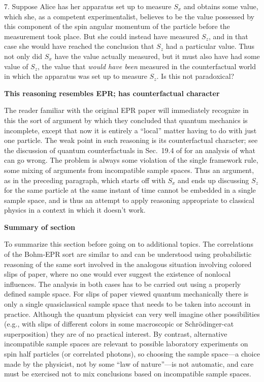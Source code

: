 \documentclass[12pt]{article} %
\def\outl#1{\par{\medskip\noindent\hspace*{.5cm}\bf
      \mathversion{bold}#1\mathversion{normal}\smallskip} }
\def\np{} \def\xa{} \def\xb{} \def\xn{} \def\xp{}
\def\outl#1{} \def\np{} \def\xa{} \def\xb{} \def\xn{} \def\xp{}
\def\outl#1{\par{\medskip\noindent\hspace*{.5cm}\bf
      \mathversion{bold}#1\mathversion{normal}\smallskip} }
\def\np{\newpage }\def\xn{\nopagebreak }\def\xp{\pagebreak }
\begin{document}
7. Suppose Alice has her apparatus set up to measure $S_x$ and obtains
some value, which she, as a competent experimentalist, believes to be the
value possessed by this component of the spin angular momentum of the particle
before the measurement took place.  But she could instead have measured $S_z$,
and in that case she would have reached the conclusion that $S_z$ had a
particular value.  Thus not only did $S_x$ have the value actually measured,
but it must also have had some value of $S_z$, the value that \emph{would have
  been} measured in the counterfactual world in which the apparatus was set up
to measure $S_z$.  Is this not paradoxical?

\xb
\outl{This reasoning resembles EPR; has counterfactual character}
\xa


The reader familiar with the original EPR paper \cite{EnPR35} will immediately
recognize in this the sort of argument by which they concluded that quantum
mechanics is incomplete, except that now it is entirely a ``local'' matter
having to do with just one particle.  The weak point in such reasoning is its
counterfactual character; see the discussion of quantum counterfactuals in
Sec.~19.4 of \cite{Grff02c} for an analysis of what can go wrong. The problem
is always some violation of the single framework rule, some mixing of
arguments from incompatible sample spaces. Thus an argument, as in the
preceding paragraph, which starts off with $S_x$ and ends up discussing $S_z$
for the same particle at the same instant of time cannot be embedded in a
single sample space, and is thus an attempt to apply reasoning appropriate to
classical physics in a context in which it doesn't work.

\xb
\outl{Summary of section}
\xa


To summarize this section before going on to additional topics. The
correlations of the Bohm-EPR sort are similar to and can be understood using
probabilistic reasoning of the same sort involved in the analogous situation
involving colored slips of paper, where no one would ever suggest the
existence of nonlocal influences. The analysis in both cases has to be carried
out using a properly defined sample space.  For slips of paper viewed quantum
mechanically there is only a single quasiclassical sample space that needs to
be taken into account in practice. Although the quantum physicist can very
well imagine other possibilities (e.g., with slips of different colors in some
macroscopic or Schr\"odinger-cat superposition) they are of no practical
interest.  By contrast, alternative incompatible sample spaces are relevant to
possible laboratory experiments on spin half particles (or correlated
photons), so choosing the sample space---a choice made by the physicist, not
by some ``law of nature''---is not automatic, and care must be exercised not
to mix conclusions based on incompatible sample spaces.
\end{document}
